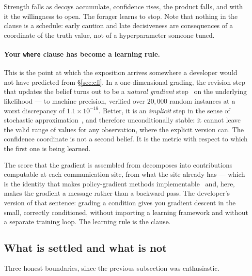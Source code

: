 Strength falls as decoys accumulate, confidence rises, the product falls, and
with it the willingness to open. The forager learns to stop. Note that nothing in
the clause is a schedule: early caution and late decisiveness are consequences of
a coordinate of the truth value, not of a hyperparameter someone tuned.

\paragraph{Your \texttt{where} clause has become a learning rule.} This is the
point at which the exposition arrives somewhere a developer would not have
predicted from \S\ref{sec:cfl}. In a one-dimensional grading, the revision step
that updates the belief turns out to be a \emph{natural gradient}
step~\cite{Amari98} on the underlying likelihood --- to machine precision, verified over $20{,}000$ random
instances at a worst discrepancy of $1.1 \times 10^{-16}$. Better, it is an
\emph{implicit} step in the sense of stochastic approximation~\cite{RobbinsMonro51},
and therefore unconditionally stable: it cannot leave the
valid range of values for any observation, where the explicit version can. The
confidence coordinate is not a second belief. It is the metric with respect to
which the first one is being learned.

The score that the gradient is assembled from decomposes into contributions
computable at each communication site, from what the site already has --- which
is the identity that makes policy-gradient methods
implementable~\cite{Williams92} and, here, makes the gradient a message rather
than a backward pass. The developer's version of that sentence: grading a
condition gives you gradient descent in the small, correctly conditioned, without importing a learning
framework and without a separate training loop. The learning rule is the
clause.

\subsection{What is settled and what is not}

Three honest boundaries, since the previous subsection was enthusiastic.

